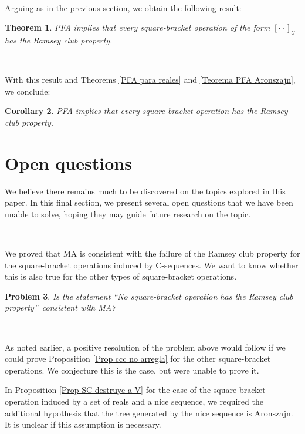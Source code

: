 \documentclass{article}
\newtheorem{theorem}{Theorem}
\newtheorem{corollary}[theorem]{Corollary}
\newtheorem{problem}[theorem]{Problem}
\begin{document}
\qquad\ \qquad\ \qquad\ \qquad\ \qquad\ 

Arguing as in the previous section, we obtain the following result:

\begin{theorem}
\textsf{PFA }implies that every square-bracket operation of the form
$[\cdot\cdot]_{\mathcal{C}}$ has the Ramsey club property.
\end{theorem}

\qquad\ \ \ 

With this result and Theorems \ref{PFA para reales} and
\ref{Teorema PFA Aronszajn}, we conclude:

\begin{corollary}
\textsf{PFA }implies that every square-bracket operation has the Ramsey club property.
\end{corollary}

\section{Open questions}

We believe there remains much to be discovered on the topics explored in this
paper. In this final section, we present several open questions that we have
been unable to solve, hoping they may guide future research on the topic.

\qquad\ \ \ 

We proved that \textsf{MA }is consistent with the failure of the Ramsey club
property for the square-bracket operations induced by \textsf{C}-sequences. We
want to know whether this is also true for the other types of square-bracket operations.

\begin{problem}
Is the statement \textquotedblleft No square-bracket operation has the Ramsey
club property\textquotedblright\ consistent with \textsf{MA?}
\end{problem}

\qquad\ \qquad\ \ \qquad

As noted earlier, a positive resolution of the problem above would follow if
we could prove Proposition \ref{Prop ccc no arregla} for the other
square-bracket operations. We conjecture this is the case, but were unable to
prove it.

\qquad\qquad\qquad\qquad\qquad\qquad

In Proposition \ref{Prop SC destruye a V} for the case of the square-bracket
operation induced by a set of reals and a nice sequence, we required the
additional hypothesis that the tree generated by the nice sequence is
Aronszajn. It is unclear if this assumption is necessary.
\end{document}
